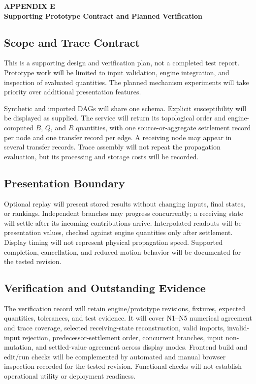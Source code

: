 \clearpage
\thispagestyle{empty}
\label{app:prototype-contract}

{
\centering
\textbf{APPENDIX E}\\
\textbf{Supporting Prototype Contract and Planned Verification}\par
}
\vspace{\baselineskip}

\subsection{Scope and Trace Contract}

This is a supporting design and verification plan, not a completed test
report. Prototype work will be limited to input validation, engine integration,
and inspection of evaluated quantities. The planned mechanism experiments
will take priority over additional presentation features.

Synthetic and imported DAGs will share one schema. Explicit susceptibility
will be displayed as supplied. The service will return its topological order
and engine-computed $B$, $Q$, and $R$ quantities, with one source-or-aggregate
settlement record per node and one transfer record per edge. A receiving node
may appear in several transfer records. Trace assembly will not repeat the
propagation evaluation, but its processing and storage costs will be recorded.

\subsection{Presentation Boundary}

Optional replay will present stored results without changing inputs, final
states, or rankings. Independent branches may progress concurrently; a
receiving state will settle after its incoming contributions arrive.
Interpolated readouts will be presentation values, checked against engine
quantities only after settlement. Display timing will not represent physical
propagation speed. Supported completion, cancellation, and reduced-motion
behavior will be documented for the tested revision.

\subsection{Verification and Outstanding Evidence}

The verification record will retain engine/prototype revisions, fixtures,
expected quantities, tolerances, and test evidence. It will cover N1--N5
numerical agreement and trace coverage, selected receiving-state
reconstruction, valid imports, invalid-input rejection, predecessor-settlement
order, concurrent branches, input non-mutation, and settled-value agreement
across display modes. Frontend build and edit/run checks will be complemented
by automated and manual browser inspection recorded for the tested revision.
Functional checks will not establish operational utility or deployment
readiness.

